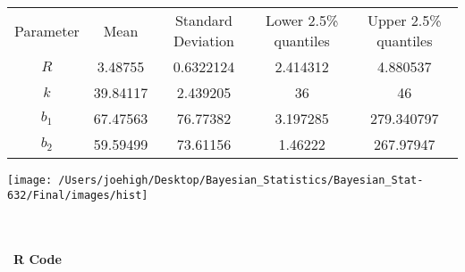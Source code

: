 \documentclass[10pt,a4paper]{article}
\begin{document}
\begin{center}
  \begin{tabular}{ |c|c|c|c|c| }
  \hline
  Parameter & Mean & Standard Deviation & Lower 2.5\% quantiles & Upper 2.5\% quantiles  \\ 
  $R$ & 3.48755 & 0.6322124 & 2.414312 & 4.880537 \\
  $k$ & 39.84117 & 2.439205 & 36 & 46 \\
  $b_1$ & 67.47563 &  76.77382 &  3.197285  & 279.340797  \\
  $b_2$ &  59.59499 & 73.61156 & 1.46222 & 267.97947 \\
  \hline
  \end{tabular}
  \end{center}
\centerline{\texttt{[image: /Users/joehigh/Desktop/Bayesian\_Statistics/Bayesian\_Stat-632/Final/images/hist]}}
\text{}\\
\\\
\textbf{R Code} 
\end{document}
